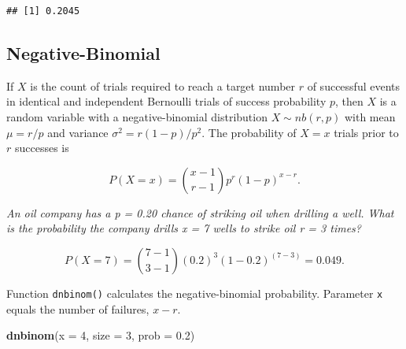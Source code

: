 \documentclass[]{book}
\newenvironment{Shaded}{\begin{snugshade}}{\end{snugshade}}
\newcommand{\DataTypeTok}[1]{\textcolor[rgb]{0.13,0.29,0.53}{#1}}
\newcommand{\DecValTok}[1]{\textcolor[rgb]{0.00,0.00,0.81}{#1}}
\newcommand{\FloatTok}[1]{\textcolor[rgb]{0.00,0.00,0.81}{#1}}
\newcommand{\KeywordTok}[1]{\textcolor[rgb]{0.13,0.29,0.53}{\textbf{#1}}}
\newcommand{\NormalTok}[1]{#1}
\newcommand{\OperatorTok}[1]{\textcolor[rgb]{0.81,0.36,0.00}{\textbf{#1}}}
\newcommand{\StringTok}[1]{\textcolor[rgb]{0.31,0.60,0.02}{#1}}
\begin{document}
\begin{Shaded}
\end{Shaded}

\begin{verbatim}
## [1] 0.2045
\end{verbatim}

\hypertarget{negative-binomial}{%
\subsection{Negative-Binomial}\label{negative-binomial}}

If \(X\) is the count of trials required to reach a target number \(r\) of successful events in identical and independent Bernoulli trials of success probability \(p\), then \(X\) is a random variable with a negative-binomial distribution \(X \sim nb(r,p)\) with mean \(\mu=r/p\) and variance \(\sigma^2 = r(1-p)/p^2\). The probability of \(X=x\) trials prior to \(r\) successes is

\[P(X=x) = {{x - 1} \choose {r - 1}} p^r (1-p)^{x-r}.\]

\emph{An oil company has a p = 0.20 chance of striking oil when drilling a well. What is the probability the company drills x = 7 wells to strike oil r = 3 times?}

\[P(X=7) = {{7 - 1} \choose {3 - 1}} (0.2)^3 (1-0.2)^{(7-3)} = 0.049.\]

Function \texttt{dnbinom()} calculates the negative-binomial probability. Parameter \texttt{x} equals the number of failures, \(x - r\).

\begin{Shaded}
\begin{Highlighting}[]
\KeywordTok{dnbinom}\NormalTok{(}\DataTypeTok{x =} \DecValTok{4}\NormalTok{, }\DataTypeTok{size =} \DecValTok{3}\NormalTok{, }\DataTypeTok{prob =} \FloatTok{0.2}\NormalTok{)}
\end{Highlighting}
\end{Shaded}
\end{document}
